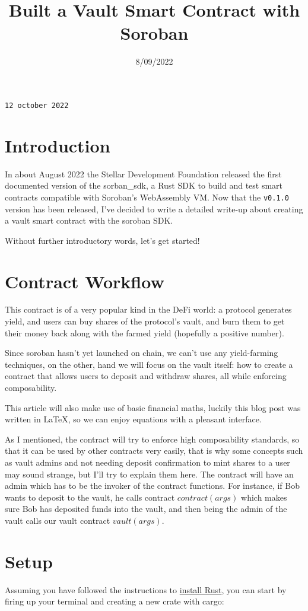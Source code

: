 \documentclass{article}
\title{Built a Vault Smart Contract with Soroban}
\date{8/09/2022}
\newcommand{\inl}[1]{\lstinline{#1}}
\begin{document}
\maketitle

\texttt{12 october 2022}

\section{Introduction}
In about August 2022 the Stellar Development Foundation released the first documented version of the sorban_sdk, a Rust SDK to build and test smart contracts compatible with Soroban’s WebAssembly VM. Now that the \inl{v0.1.0} version has been released, I’ve decided to write a detailed write-up about creating a vault smart contract with the soroban SDK.

Without further introductory words, let’s get started!

\section{Contract Workflow}
This contract is of a very popular kind in the DeFi world: a protocol generates yield, and users can buy shares of the protocol's vault, and burn them to get their money back along with the farmed yield (hopefully a positive number).

Since soroban hasn't yet launched on chain, we can't use any yield-farming techniques, on the other, hand we will focus on the vault itself: how to create a contract that allows users to deposit and withdraw shares, all while enforcing composability.

This article will also make use of basic financial maths, luckily this blog post was written in \LaTeX, so we can enjoy equations with a pleasant interface.

As I mentioned, the contract will try to enforce high composability standards, so that it can be used by other contracts very easily, that is why some concepts such as vault admins and not needing deposit confirmation to mint shares to a user may sound strange, but I'll try to explain them here. The contract will have an admin which has to be the invoker of the contract functions. For instance, if Bob wants to deposit to the vault, he calls contract \( contract (args) \) which makes sure Bob has deposited funds into the vault, and then being the admin of the vault calls our vault contract \( vault (args) \).

\section{Setup}
Assuming you have followed the instructions to \href{https://www.rust-lang.org/tools/install}{install Rust}, you can start by firing up your terminal and creating a new crate with cargo:
\end{document}
